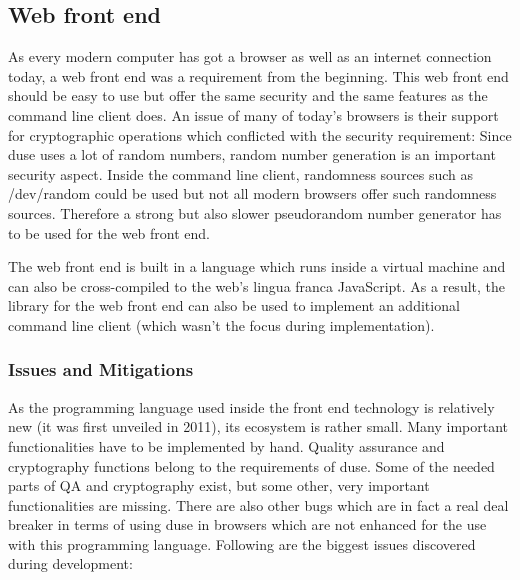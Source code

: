 \subsection{Web front end}

As every modern computer has got a browser as well as an internet connection today,
a web front end was a requirement from the beginning. This web front end should be
easy to use but offer the same security and the same features as the command line
client does. An issue of many of today's browsers is their support for
cryptographic operations which conflicted with the security requirement:
Since duse uses a lot of random numbers, random number generation is an important
security aspect. Inside the command line client, randomness sources such as
/dev/random could be used but not all modern browsers offer such randomness
sources. Therefore a strong but also slower pseudorandom number generator has
to be used for the web front end.

The web front end is built in a language which runs inside a virtual machine and
can also be cross-compiled to the web's lingua franca JavaScript. As a result,
the library for the web front end can also be used to implement an
additional command line client (which wasn't the focus during implementation).

\subsubsection{Issues and Mitigations}

As the programming language used inside the front end technology is relatively
new (it was first unveiled in 2011), its ecosystem is rather small. Many
important functionalities have to be implemented by hand. Quality assurance
and cryptography functions belong to the requirements of duse. Some of the
needed parts of QA and cryptography exist, but some other, very important
functionalities are missing. There are also other bugs which are in fact a
real deal breaker in terms of using duse in browsers which are not enhanced
for the use with this programming language. Following are the biggest issues
discovered during development:

